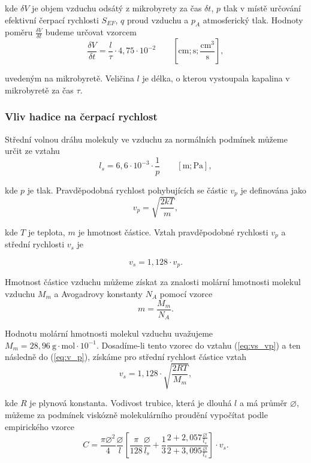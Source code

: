 \documentclass[english]{article}
\newcommand{\unit}[1]{\mathrm{#1}}
\begin{document}
	
	kde $\delta V$ je objem vzduchu odsátý z mikrobyrety za čas $\delta t$,
	$p$ tlak v místě určování efektivní čerpací rychlosti $S_{EF}$,
	$q$ proud vzduchu a $p_{A}$ atmosferický tlak. Hodnoty poměru $\frac{\delta V}{\delta t}$
	budeme určovat vzorcem 
	\begin{equation}
	\frac{\delta V}{\delta t}=\frac{l}{\tau}\cdot4,75\cdot10^{-2}\qquad\unit{[cm;s;\frac{{cm^{3}}}{s}]},\label{eq:dV/dt_empiric}
	\end{equation}
	
	
	uvedeným na mikrobyretě. Veličina $l$ je délka, o kterou vystoupala
	kapalina v mikrobyretě za čas $\tau$.
	
	
	\subsubsection{Vliv hadice na čerpací rychlost}
	
	Střední volnou dráhu molekuly ve vzduchu za normálních podmínek můžeme
	určit ze vztahu
	\begin{equation}
	l_{s}=6,6\cdot10^{-3}\cdot\frac{1}{p}\qquad\unit{[m;Pa]},
	\label{eq:ls}
	\end{equation}
	
	
	kde $p$ je tlak. Pravděpodobná rychlost pohybujících se částic $v_{p}$ je definována
	jako
	\begin{equation}
	v_{p}=\sqrt{\frac{2kT}{m}},\label{eq:v_p}
	\end{equation}
	
	
	kde $T$ je teplota, $m$ je hmotnost částice. Vztah pravděpodobné
	rychlosti $v_{p}$ a střední rychlosti $v_{s}$ je 
	
	\begin{equation}
	v_{s}=1,128\cdot v_{p}.\label{eq:vs_vp}
	\end{equation}
	
	
	Hmotnost částice vzduchu můžeme získat za znalosti molární hmotnosti
	molekul vzduchu $M_{m}$ a Avogadrovy konstanty $N_{A}$ pomocí vzorce
	\[
	m=\frac{M_{m}}{N_{A}}.
	\]
	
	
	Hodnotu molární hmotnosti molekul vzduchu uvažujeme $M_{m}=28,96~\unit{g\cdot mol\cdot10^{-1}}$.
	Dosadíme-li tento vzorec do vztahu (\ref{eq:vs_vp}) a ten následně
	do (\ref{eq:v_p}), získáme pro střední rychlost částice vztah
	\begin{equation}
	v_{s}=1,128\cdot\sqrt{\frac{2RT}{M_{m}}},\label{eq:vs}
	\end{equation}
	
	
	kde $R$ je plynová konstanta. Vodivost trubice, která je dlouhá $l$
	a má průměr $\diameter$, můžeme za podmínek viskózně molekulárního
	proudění vypočítat podle empirického vzorce \cite{bib:praskripta}
	\begin{equation}
	C=\frac{\pi\diameter^{2}}{4}\frac{\diameter}{l}\left[\frac{\pi}{128}\frac{\diameter}{l_{s}}+\frac{{1}}{3}\frac{{2+2,057\frac{{\diameter}}{l_{s}}}}{2+3,095\frac{{\diameter}}{l_{s}}}\right]\cdot v_{s}.
	\label{eq:Cvm}
	\end{equation}
		
\end{document}
